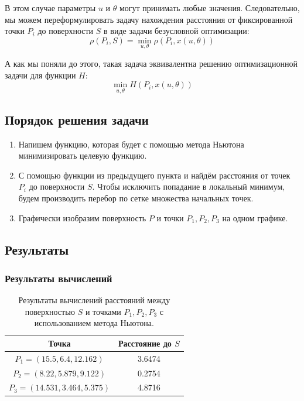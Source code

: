 \documentclass[12pt]{article}%
\begin{document}
В этом случае параметры $u$ и $\theta$ могут принимать любые значения. Следовательно, мы можем переформулировать задачу нахождения расстояния от фиксированной точки $P_i$ до поверхности $S$ в виде задачи безусловной оптимизации:
\begin{equation*}
    \rho(P_i, S) = \min_{u, \theta}\rho(P_i, x(u, \theta))
\end{equation*}

А как мы поняли до этого, такая задача эквивалентна решению оптимизационной задачи для функции $H$:
\begin{equation*}
    \min_{u, \theta}H(P_i, x(u, \theta))
\end{equation*}

\subsection{Порядок решения задачи}
\begin{enumerate}
    \item Напишем функцию, которая будет с помощью метода Ньютона минимизировать целевую функцию.
    \item С помощью функции из предыдущего пункта и найдём расстояния от точек $P_i$ до поверхности $S$. Чтобы исключить попадание в локальный минимум, будем производить перебор по сетке множества начальных точек.
    \item Графически изобразим поверхность $P$ и точки $P_1, P_2, P_3$ на одном графике.
\end{enumerate}

\subsection{Результаты}
\subsubsection{Результаты вычислений}
\begin{table}[!h]
    \centering
    \begin{tabular}{|c|c|}
    \hline Точка & Расстояние до $S$ \\
    \hline $P_1 = (15.5, 6.4, 12.162)  $  & 3.6474 \\
    \hline $P_2 = (8.22, 5.879, 9.122) $  & 0.2754 \\
    \hline $P_3 = (14.531, 3.464, 5.375)$ & 4.8716 \\
    \hline
    \end{tabular}
    \caption{Результаты вычислений расстояний между поверхностью $S$ и точками $P_1, P_2, P_3$ с использованием метода Ньютона.}
    \label{tab:my_label}
\end{table}
\end{document}
